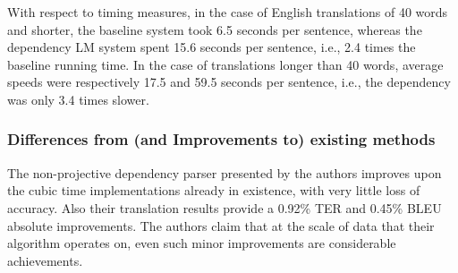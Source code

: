 \documentclass[10pt, letter]{article}
\begin{document}
With respect to timing measures, in the case of English translations of 40 words and shorter, the baseline system took 6.5 seconds
per sentence, whereas the dependency LM system spent 15.6 seconds per sentence, i.e., 2.4 times the baseline running time. In the case of translations longer than 40 words, average speeds were respectively 17.5 and 59.5 seconds per sentence, i.e., the dependency was only 3.4 times slower.

\subsubsection*{Differences from (and Improvements to) existing methods}

The non-projective dependency parser presented by the authors improves upon the cubic time implementations already in existence, with very little loss of accuracy. Also their translation results provide a 0.92\% TER and 0.45\% BLEU absolute improvements. The authors claim that at the scale of data that their algorithm operates on, even such minor improvements are considerable achievements.




\end{document}
